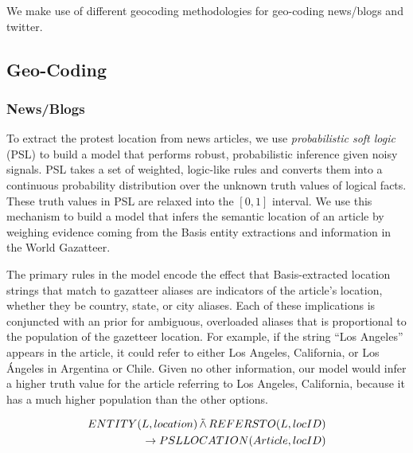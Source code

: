%
%

We make use of different geocoding methodologies for geo-coding news/blogs and twitter.

\subsection{Geo-Coding}

\subsubsection{News/Blogs}

\label{subsection:geocoding}
To extract the protest location from news articles, we use \emph{probabilistic soft logic} (PSL) \cite{broecheler:uai10} to build a model that performs robust, probabilistic inference given noisy signals. PSL takes a set of weighted, logic-like rules and converts them into a continuous probability distribution over the unknown truth values of logical facts. These truth values in PSL are relaxed into the $[0,1]$ interval. We use this mechanism to build a model that infers the semantic location of an article by weighing evidence coming from the Basis entity extractions and information in the World Gazatteer. 

The primary rules in the model encode the effect that Basis-extracted location strings that match to gazatteer aliases are indicators of the article's location, whether they be country, state, or city aliases. Each of these implications is conjuncted with an prior for ambiguous, overloaded aliases that is proportional to the population of the gazetteer location. For example, if the string ``Los Angeles'' appears in the article, it could refer to either Los Angeles, California, or Los \'{A}ngeles in Argentina or Chile. Given no other information, our model would infer a higher truth value for the article referring to Los Angeles, California, because it has a much higher population than the other options. 

\begin{align*}
    \begin{split}
    ENTITY(L, location) \softand REFERSTO(L, locID)\\
    \rightarrow PSLLOCATION(Article, locID)
\end{split}
\end{align*}


